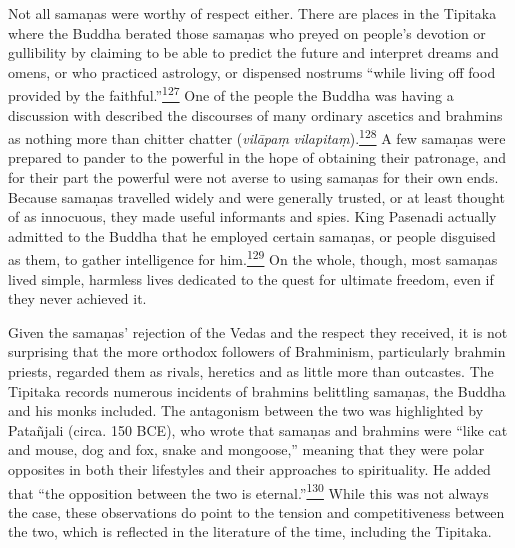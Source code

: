 Not all samaṇas were worthy of respect either. There are places in the
Tipitaka where the Buddha berated those samaṇas who preyed on people's
devotion or gullibility by claiming to be able to predict the future and
interpret dreams and omens, or who practiced astrology, or dispensed
nostrums ``while living off food provided by the
faithful.''\label{footprints_split_007.html_fnref127}\hyperref[footprints_split_024.htmlux5cux23fn127]{\textsuperscript{127}}
One of the people the Buddha was having a discussion with described the
discourses of many ordinary ascetics and brahmins as nothing more than
chitter chatter (\emph{vilāpaṃ}
\emph{vilapitaṃ}).\label{footprints_split_007.html_fnref128}\hyperref[footprints_split_024.htmlux5cux23fn128]{\textsuperscript{128}}
A few samaṇas were prepared to pander to the powerful in the hope of
obtaining their patronage, and for their part the powerful were not
averse to using samaṇas for their own ends. Because samaṇas travelled
widely and were generally trusted, or at least thought of as innocuous,
they made useful informants and spies. King Pasenadi actually admitted
to the Buddha that he employed certain samaṇas, or people disguised as
them, to gather intelligence for
him.\label{footprints_split_007.html_fnref129}\hyperref[footprints_split_024.htmlux5cux23fn129]{\textsuperscript{129}}
On the whole, though, most samaṇas lived simple, harmless lives
dedicated to the quest for ultimate freedom, even if they never achieved
it.

Given the samaṇas' rejection of the Vedas and the respect they received,
it is not surprising that the more orthodox followers of Brahminism,
particularly brahmin priests, regarded them as rivals, heretics and as
little more than outcastes. The Tipitaka records numerous incidents of
brahmins belittling samaṇas, the Buddha and his monks included. The
antagonism between the two was highlighted by Patañjali (circa. 150
BCE), who wrote that samaṇas and brahmins were ``like cat and mouse, dog
and fox, snake and mongoose,'' meaning that they were polar opposites in
both their lifestyles and their approaches to spirituality. He added
that ``the opposition between the two is
eternal.''\label{footprints_split_007.html_fnref130}\hyperref[footprints_split_024.htmlux5cux23fn130]{\textsuperscript{130}}
While this was not always the case, these observations do point to the
tension and competitiveness between the two, which is reflected in the
literature of the time, including the Tipitaka.

